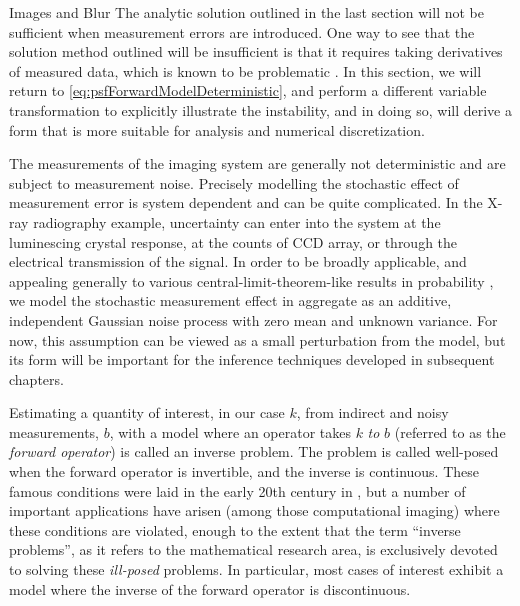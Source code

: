 \begin{chapter}{Images and Blur}
  The analytic solution outlined in the last section will not be sufficient when measurement errors are introduced. 
  One way to see that the solution method outlined will be insufficient is that it requires taking derivatives of measured data, which is known to be problematic \citep{hanke2001}.
  In this section, we will return to \eqref{eq:psfForwardModelDeterministic}, and perform a different variable transformation to explicitly illustrate the instability, and in doing so, will derive a form that is more suitable for analysis and numerical discretization.

  The measurements of the imaging system are generally not deterministic and are subject to measurement noise.
  Precisely modelling the stochastic effect of measurement error is system dependent and can be quite complicated.
  In the X-ray radiography example, uncertainty can enter into the system at the luminescing crystal response, at the counts of CCD array, or through the electrical transmission of the signal.
  In order to be broadly applicable, and appealing generally to various central-limit-theorem-like results in probability \citep{durrett2010probability}, we model the stochastic measurement effect in aggregate as an additive, independent Gaussian noise process with zero mean and unknown variance.  
  For now, this assumption can be viewed as a small perturbation from the model, but its form will be important for the inference techniques developed in subsequent chapters.

  Estimating a quantity of interest, in our case $k$, from indirect and noisy measurements, $b$, with a model where an operator takes $k$ \emph{to} $b$ (referred to as the \emph{forward operator}) is called an inverse problem.  
  The problem is called well-posed when the forward operator is invertible, and the inverse is continuous. %
  These famous conditions were laid in the early 20th century in \citep{hadamard1902}, but a number of important applications have arisen (among those computational imaging) where these conditions are violated, enough to the extent that the term ``inverse problems'', as it refers to the mathematical research area, is exclusively devoted to solving these \emph{ill-posed} problems.
  In particular, most cases of interest %
  exhibit a model where the inverse of the forward operator is discontinuous.


\end{chapter}
